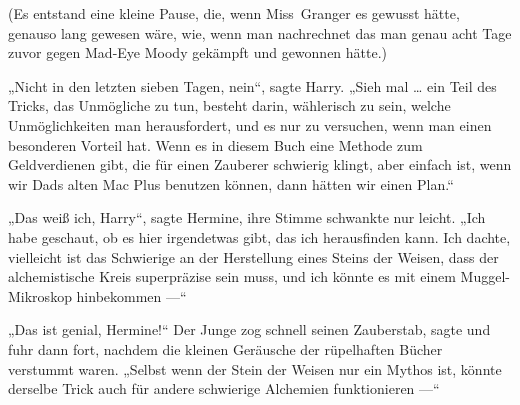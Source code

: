 (Es entstand eine kleine Pause, die, wenn Miss~Granger es gewusst hätte, genauso lang gewesen wäre, wie, wenn man nachrechnet das man genau acht Tage zuvor gegen Mad-Eye Moody gekämpft und gewonnen hätte.)

„Nicht in den letzten sieben Tagen, nein“, sagte Harry.
„Sieh mal … ein Teil des Tricks, das Unmögliche zu tun, besteht darin, wählerisch zu sein, welche Unmöglichkeiten man herausfordert, und es nur zu versuchen, wenn man einen besonderen Vorteil hat. Wenn es in diesem Buch eine Methode zum Geldverdienen gibt, die für einen Zauberer schwierig klingt, aber einfach ist, wenn wir Dads alten Mac Plus benutzen können, dann hätten wir einen Plan.“

„Das weiß ich, Harry“, sagte Hermine, ihre Stimme schwankte nur leicht.
„Ich habe geschaut, ob es hier irgendetwas gibt, das ich herausfinden kann. Ich dachte, vielleicht ist das Schwierige an der Herstellung eines Steins der Weisen, dass der alchemistische Kreis superpräzise sein muss, und ich könnte es mit einem Muggel-Mikroskop hinbekommen —“

„Das ist genial, Hermine!“ Der Junge zog schnell seinen Zauberstab, sagte  und fuhr dann fort, nachdem die kleinen Geräusche der rüpelhaften Bücher verstummt waren.
„Selbst wenn der Stein der Weisen nur ein Mythos ist, könnte derselbe Trick auch für andere schwierige Alchemien funktionieren —“


